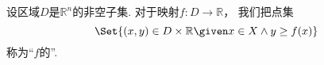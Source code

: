 \begin{definition}
设区域\(D\)是\(\mathbb{R}^n\)的非空子集.
对于映射\(f\colon D \to \mathbb{R}\)，
我们把点集\[
	\Set{
		(x,y) \in D\times\mathbb{R}
		\given
		x \in X
		\land
		y \geq f(x)
	}
\]
称为“\(f\)的”.
\end{definition}
